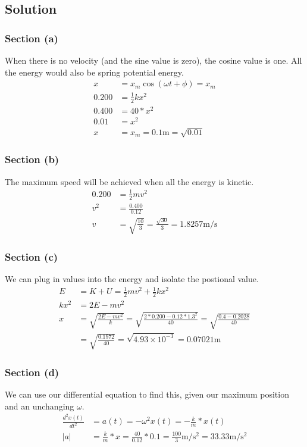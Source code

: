 \documentclass[12pt]{article}
\begin{document}
\subsection{Solution}
\subsubsection{Section (a)}
When there is no velocity (and the sine value is zero), the cosine value is one. All the energy would also be spring potential energy. 
\begin{align}
    x   &=  x_{m}\cos(\omega t + \phi)
        =   x_{m}\\
    0.200   &=  \frac{1}{2}kx^2\\
    0.400   &=  40*x^2\\
    0.01    &=  x^2\\
    x   &=  \boxed{x_m
        =   0.1\unit{\meter}}
        =   \sqrt{0.01}
\end{align}

\subsubsection{Section (b)}
The maximum speed will be achieved when all the energy is kinetic.
\begin{align}
    0.200   &=  \frac{1}{2}mv^2\\
    v^2 &=  \frac{0.400}{0.12}\\
    v   &=  \sqrt{\frac{10}{3}}
        =   \frac{\sqrt{30}}{3}
        =   \boxed{1.8257\unit{\meter/\second}}
\end{align}

\subsubsection{Section (c)}
We can plug in values into the energy and isolate the postional value.
\begin{align}
    E   &=  K + U
        =   \frac{1}{2}mv^2 + \frac{1}{2}kx^2\\
    kx^2    &=  2E - mv^2\\
    x   &=  \sqrt{\frac{2E - mv^2}{k}}
        =   \sqrt{\frac{2*0.200 - 0.12*1.3^2}{40}}
        =   \sqrt{\frac{0.4 - 0.2028}{40}}\\
        &=  \sqrt{\frac{0.1972}{40}}
        =   \sqrt{4.93\times10^{-3}}
        =   \boxed{0.07021\unit{\meter}}
\end{align}

\subsubsection{Section (d)}
We can use our differential equation to find this, given our maximum position and an unchanging $\omega$.
\begin{align}
    \frac{d^2 x(t)}{dt^2}   &=  a(t)
        =   -\omega^2 x(t)
        =   -\frac{k}{m} * x(t)\\
    |a| &=  \frac{k}{m} * x
        =   \frac{40}{0.12} * 0.1
        =   \boxed{\frac{100}{3}\unit{\meter/\second^2}
        =   33.33\unit{\meter/\second^2}}
\end{align}
\end{document}
